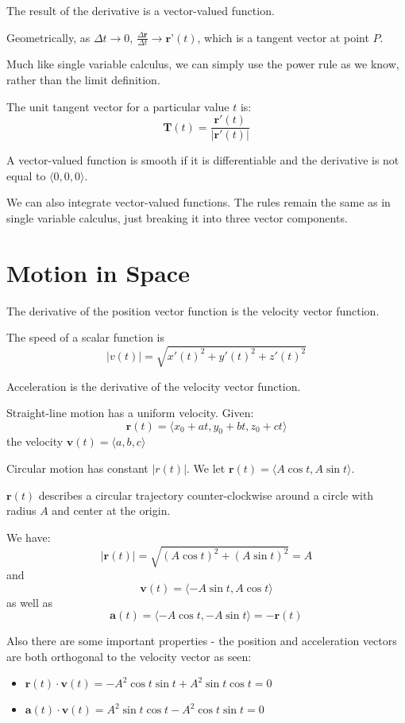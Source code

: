 \documentclass[../calc3.tex]{subfiles}
\begin{document}
The result of the derivative is a vector-valued function.

Geometrically, as $\Delta t\rightarrow 0$, $\frac{\Delta \textbf{r}}{\Delta t}\rightarrow \textbf{r'}(t)$, 
which is a tangent vector at point $P$.

Much like single variable calculus, we can simply use the power rule as we know, rather than the limit definition.

The unit tangent vector for a particular value $t$ is:
\[\textbf{T}(t)=\frac{\textbf{r}'(t)}{|\textbf{r}'(t)|}\]

A vector-valued function is smooth if it is differentiable and the derivative is not equal to $\langle 0,0,0\rangle$.

We can also integrate vector-valued functions. The rules remain the same as in single 
variable calculus, just breaking it into three vector components.

\section{Motion in Space}
The derivative of the position vector function is the velocity vector function. 

The speed of a scalar function is 
\[|v(t)|=\sqrt{x'(t)^2+y'(t)^2+z'(t)^2}\]

Acceleration is the derivative of the velocity vector function.

Straight-line motion has a uniform velocity. Given:
\[\textbf{r}(t)=\langle x_0+at,y_0+bt,z_0+ct\rangle\]
the velocity $\textbf{v}(t) = \langle a,b,c\rangle$

Circular motion has constant $|r(t)|$. We let $\textbf{r}(t)=\langle A\cos t, A\sin t\rangle$.

$\textbf{r}(t)$ describes a circular trajectory counter-clockwise around a circle with radius $A$ and center at the origin.

We have:
\[|\textbf{r}(t)|=\sqrt{(A\cos t)^2+(A\sin t)^2}=A\]
and
\[\textbf{v}(t)=\langle -A\sin t, A\cos t\rangle\]
as well as
\[\textbf{a}(t)=\langle -A\cos t, -A\sin t\rangle=-\textbf{r}(t)\]

Also there are some important properties - the position and acceleration vectors are both 
orthogonal to the velocity vector as seen:
\begin{itemize}
    \item $\textbf{r}(t)\cdot\textbf{v}(t)=-A^2\cos t\sin t+A^2\sin t \cos t = 0$
    \item $\textbf{a}(t)\cdot\textbf{v}(t)=A^2\sin t\cos t-A^2\cos t\sin t = 0$
\end{itemize}
\end{document}
